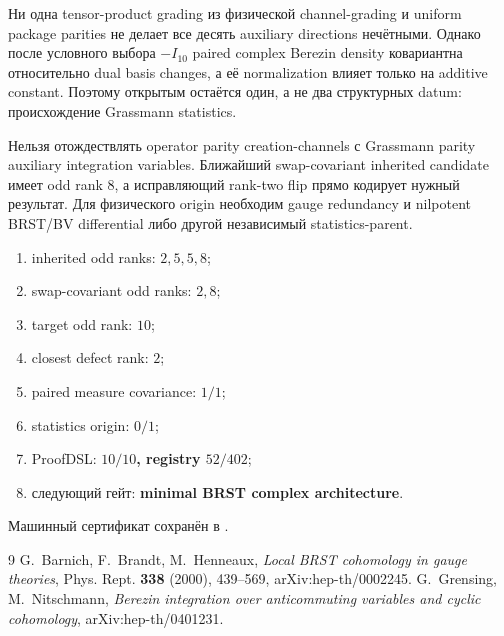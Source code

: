 \begin{theorem}
Ни одна tensor-product grading из физической channel-grading и uniform
package parities не делает все десять auxiliary directions нечётными.
Однако после условного выбора $-I_{10}$ paired complex Berezin density
ковариантна относительно dual basis changes, а её normalization влияет
только на additive constant. Поэтому открытым остаётся один, а не два
структурных datum: происхождение Grassmann statistics.
\end{theorem}

\begin{nogocriterion}
Нельзя отождествлять operator parity creation-channels с Grassmann parity
auxiliary integration variables. Ближайший swap-covariant inherited
candidate имеет odd rank $8$, а исправляющий rank-two flip прямо кодирует
нужный результат. Для физического origin необходим gauge redundancy и
nilpotent BRST/BV differential либо другой независимый statistics-parent.
\end{nogocriterion}

\begin{protocol}\begin{enumerate}
\item inherited odd ranks: \textbf{$2,5,5,8$};
\item swap-covariant odd ranks: \textbf{$2,8$};
\item target odd rank: \textbf{$10$};
\item closest defect rank: \textbf{$2$};
\item paired measure covariance: \textbf{$1/1$};
\item statistics origin: \textbf{$0/1$};
\item ProofDSL: \textbf{$10/10$, registry $52/402$};
\item следующий гейт: \textbf{minimal BRST complex architecture}.
\end{enumerate}\end{protocol}

Машинный сертификат сохранён в
.

\begin{thebibliography}{9}
G.~Barnich, F.~Brandt, M.~Henneaux,
\emph{Local BRST cohomology in gauge theories},
Phys. Rept. \textbf{338} (2000), 439--569, arXiv:hep-th/0002245.
G.~Grensing, M.~Nitschmann,
\emph{Berezin integration over anticommuting variables and cyclic
cohomology}, arXiv:hep-th/0401231.
\end{thebibliography}